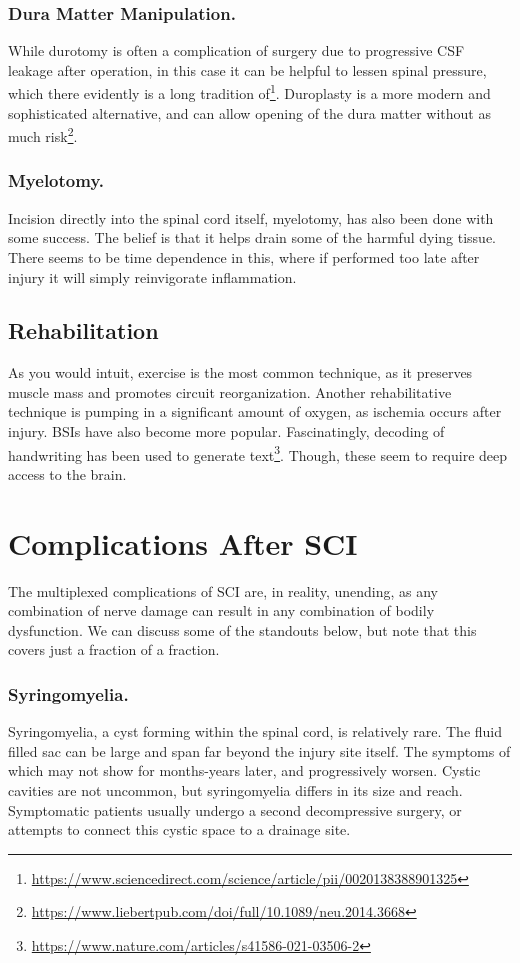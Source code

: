 \subsubsection{Dura Matter Manipulation.}
 While durotomy is often a complication of surgery due to progressive CSF leakage after operation, in this case it can be helpful to lessen spinal pressure, which there evidently is a long tradition of\footnote{\url{https://www.sciencedirect.com/science/article/pii/0020138388901325}}. Duroplasty is a more modern and sophisticated alternative, and can allow opening of the dura matter without as much risk\footnote{\url{https://www.liebertpub.com/doi/full/10.1089/neu.2014.3668}}.

\subsubsection{Myelotomy.}
Incision directly into the spinal cord itself, myelotomy, has also been done with some success. The belief is that it helps drain some of the harmful dying tissue. There seems to be time dependence in this, where if performed too late after injury it will simply reinvigorate inflammation. 

\subsection{Rehabilitation}
As you would intuit, exercise is the most common technique, as it preserves muscle mass and promotes circuit reorganization. Another rehabilitative technique is pumping in a significant amount of oxygen, as ischemia occurs after injury. BSIs have also become more popular. Fascinatingly, decoding of handwriting has been used to generate text\footnote{\url{https://www.nature.com/articles/s41586-021-03506-2}}. Though, these seem to require deep access to the brain. 


\section{Complications After SCI}

The multiplexed complications of SCI are, in reality, unending, as any combination of nerve damage can result in any combination of bodily dysfunction. We can discuss some of the standouts below, but note that this covers just a fraction of a fraction. 

\subsubsection{Syringomyelia.}
Syringomyelia, a cyst forming within the spinal cord, is relatively rare. The fluid filled sac can be large and span far beyond the injury site itself. The symptoms of which may not show for months-years later, and progressively worsen. Cystic cavities are not uncommon, but syringomyelia differs in its size and reach. Symptomatic patients usually undergo a second decompressive surgery, or attempts to connect this cystic space to a drainage site. 

